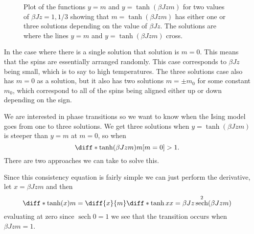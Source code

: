\documentclass[fleqn]{NotesClass}
\DeclareMathOperator{\sech}{sech}
\begin{document}
    \begin{figure}
        \caption[Solving the consistency equation for the Ising model.]{Plot of the functions \(y = m\) and \(y = \tanh(\beta Jzm)\) for two values of \(\beta Jz = 1, 1/3\) showing that \(m = \tanh(\beta Jzm)\) has either one or three solutions depending on the value of \(\beta Jz\). The solutions are where the lines \(y = m\) and \(y = \tanh(\beta Jzm)\) cross.}
        \label{fig:ising model consistency solution}
    \end{figure}
    
    In the case where there is a single solution that solution is \(m = 0\).
    This means that the spins are essentially arranged randomly.
    This case corresponds to \(\beta J z\) being small, which is to say to high temperatures.
    The three solutions case also has \(m = 0\) as a solution, but it also has two solutions \(m = \pm m_0\) for some constant \(m_0\), which correspond to all of the spins being aligned either up or down depending on the sign.
    
    We are interested in phase transitions so we want to know when the Ising model goes from one to three solutions.
    We get three solutions when \(y = \tanh(\beta Jzm)\) is steeper than \(y = m\) at \(m = 0\), so when
    \begin{equation}
        \diff*{\tanh(\beta Jzm)}{m}[m = 0] > 1.
    \end{equation}
    There are two approaches we can take to solve this.
    
    Since this consistency equation is fairly simple we can just perform the derivative, let \(x = \beta Jzm\) and then
    \begin{equation}
        \diff*{\tanh(x)}{m} = \diff{x}{m}\diff*{\tanh x}{x} = \beta Jz \sech^2(\beta Jzm)
    \end{equation}
    evaluating at zero since \(\sech 0 = 1\) we see that the transition occurs when \(\beta Jzm = 1\).
    
\end{document}
